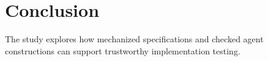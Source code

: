 \section{Conclusion}
\label{sec:conclusion}

The study explores how mechanized specifications and checked agent constructions can support trustworthy implementation testing.
